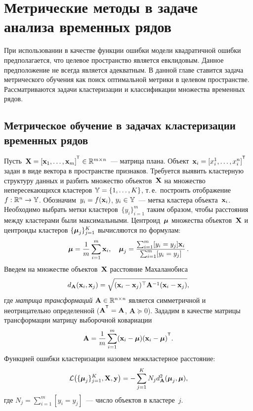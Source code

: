 \chapter{Метрические методы в задаче анализа временных рядов}
\label{ch:metric_learning}

При использовании в качестве функции ошибки модели квадратичной ошибки предполагается, что целевое пространство является евклидовым. 
Данное предположение не всегда является адекватным.
В данной главе ставится задача метрического обучения как поиск оптимальной метрики в целевом пространстве.
Рассматриваются задачи кластеризации и классификации множества временных рядов.

\section{Метрическое обучение в задачах кластеризации временных рядов}
\label{sec:ch5:metric_learning_clustering}

Пусть~$\bX = [\bx_1, \dots, \bx_m]^{\T} \in \mathbb{R}^{m \times n}$~--- матрица плана.
Объект~$\bx_i = [x_i^1, \ldots, x_i^n]^{\T}$ задан в виде вектора в пространстве признаков.
Требуется выявить кластерную структуру данных и разбить множество объектов~$\mathbf{X}$ на множество непересекающихся кластеров $\mathbb{Y} = \{1, \dots, K\}$,
т.\,е.\ построить отображение $f: \mathbb{R}^n \to \mathbb{Y}$.
Обозначим~$y_i = f (\mathbf{x}_i)$, $y_i \in \mathbb{Y}$~--- метка кластера объекта~$\mathbf{x}_i$.
Необходимо выбрать метки кластеров~$\{y_i\}_{i=1}^m$ таким образом, чтобы расстояния между кластерами были максимальными.
Центроид~$\boldsymbol{\mu}$ множества объектов~$\mathbf{X}$ и центроиды кластеров $\{\boldsymbol{\mu}_j\}_{j=1}^K$ вычисляются по формулам:
\begin{equation}
	\label{ch5:eq:mu}
	\boldsymbol{\mu} =\frac{1}{m} \sum_{i=1}^m\mathbf{x}_i, \quad
	\boldsymbol{\mu}_j =\frac{ \sum_{i=1}^m [y_i = y_j]\mathbf{x}_i } {\sum_{i=1}^m [y_i = y_j]}\,.
\end{equation}
Введем на множестве объектов~$\mathbf{X}$ расстояние Махаланобиса
\begin{equation}
	d_{\mathbf{A}} (\mathbf{x}_i, \mathbf{x}_j) = \sqrt{(\mathbf{x}_i - \mathbf{x}_j)^{\top} \mathbf{A}^{-1} (\mathbf{x}_i - \mathbf{x}_j)},
	\label{ch5:eq:mahal_distance}
\end{equation}
где \textit{матрица трансформаций} $\mathbf{A} \in \mathbb{R}^{n \times n}$ является симметричной и неотрицательно определенной ($\mathbf{A}^{\T} = \mathbf{A}$, $\mathbf{A} \succeq 0$).
Зададим в качестве матрицы трансформации матрицу выборочной ковариации
\begin{equation}
	\label{ch5:eq:covMatrix}
	\bA = \frac{1}{m} \sum_{i=1}^m(\bx_i - \bmu)(\bx_i - \bmu)^{\T}.
\end{equation}
Функцией ошибки кластеризации назовем межкластерное расстояние:
\begin{equation}
	\mathcal{L} \bigl(\{\boldsymbol{\mu}_j\}_{j=1}^K, \mathbf{X}, \mathbf{y}\bigr)= - \sum_{j=1}^K N_j d_{\mathbf{A}}^2(\boldsymbol{\mu}_j, \boldsymbol{\mu}),
	\label{ch5:eq:cluster_error_function}
\end{equation}
где $N_j = \sum_{i=1}^m [y_i = y_j]$~--- число объектов в кластере~$j$.

